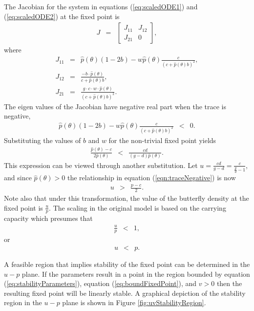 \documentclass[12pt]{article}
\begin{document}
The Jacobian for the system in equations (\ref{eq:scaledODE1}) and
(\ref{eq:scaledODE2}) at the fixed point is
\begin{eqnarray}
  J & = &
          \left[
          \begin{array}{rr}
            J_{11} & J_{12} \\
            J_{21} & 0
          \end{array}
          \right],
\end{eqnarray}
where
\begin{eqnarray}
  \label{eq:jacobian}
  J_{11} & = & \hat{p}(\theta)(1-2b) - w \hat{p}(\theta)\frac{c}{(c+\hat{p}(\theta)b)^2}, \\
  J_{12} & = & \frac{-b\cdot \hat{p}(\theta)}{c+\hat{p}(\theta)b}, \\
  J_{21} & = & \frac{g\cdot c \cdot w \cdot \hat{p}(\theta)}{(c+\hat{p}(\theta)b)^2}.
\end{eqnarray}
The eigen values of the Jacobian have negative real part when the
trace is negative,
\begin{eqnarray}
  \hat{p}(\theta)(1-2b) - w \hat{p}(\theta)\frac{c}{(c+\hat{p}(\theta)b)^2} & < & 0.
\end{eqnarray}
Substituting the values of $b$ and $w$ for the non-trivial fixed point
yields
\begin{eqnarray}
  \label{eqn:traceNegative}
  \frac{\hat{p}(\theta)-c}{2\hat{p}(\theta)} & < & \frac{cd}{(g-d)\hat{p}(\theta)}.
\end{eqnarray}
This expression can be viewed through another substitution. Let
$u=\frac{cd}{g-d}=\frac{c}{\frac{g}{d}-1}$, and since
$\hat{p}(\theta)>0$ the relationship in equation
(\ref{eqn:traceNegative}) is now
\begin{eqnarray}
  \label{eq:stabilityParameters}
  u & > & \frac{p-c}{2}.
\end{eqnarray}
Note also that under this transformation, the value of the butterfly
density at the fixed point is $\frac{u}{p}$. The scaling in the
original model is based on the carrying capacity which presumes that
\begin{eqnarray}
  \frac{u}{p} & < & 1,
\end{eqnarray}
or 
\begin{eqnarray}
  \label{eq:boundFixedPoint}
  u & < & p.
\end{eqnarray}

A feasible region that implies stability of the fixed point can be
determined in the $u-p$ plane. If the parameters result in a point in
the region bounded by equation (\ref{eq:stabilityParameters}),
equation (\ref{eq:boundFixedPoint}), and $v>0$ then the resulting
fixed point will be linearly stable. A graphical depiction of the
stability region in the $u-p$ plane is shown in Figure
\ref{fig:uvStabilityRegion}.
\end{document}

